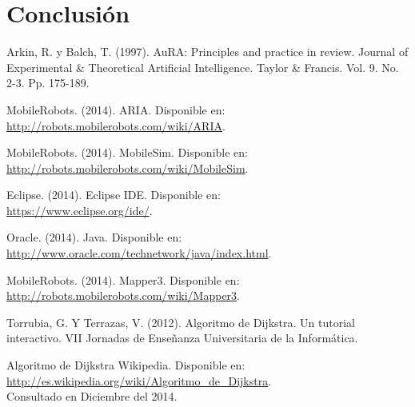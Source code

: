 \documentclass[11pt,twoside,A5]{article}
\newcommand{\link}[1]{{\footnotesize\url{#1}}}
\begin{document}
\section*{Conclusión}

\begin{thebibliography}{999}

	Arkin, R. y Balch, T. (1997).
 	AuRA: Principles and practice in review.
	Journal of Experimental \& Theoretical Artificial Intelligence.
	Taylor \& Francis. Vol. 9. No. 2-3. Pp. 175-189.
	
	MobileRobots. (2014).
	ARIA. 	
	Disponible en: \\\link{http://robots.mobilerobots.com/wiki/ARIA}.
	
	MobileRobots. (2014).
	MobileSim. 	
	Disponible en: \\\link{http://robots.mobilerobots.com/wiki/MobileSim}.
	
	Eclipse. (2014).
	Eclipse IDE. 	
	Disponible en: \\\link{https://www.eclipse.org/ide/}.

	Oracle. (2014).
	Java. 	
	Disponible en: \\\link{http://www.oracle.com/technetwork/java/index.html}.
	
	MobileRobots. (2014).
	Mapper3. 	
	Disponible en: \\\link{http://robots.mobilerobots.com/wiki/Mapper3}.
	
	Torrubia, G. Y Terrazas, V. (2012). 
	Algoritmo de Dijkstra. Un tutorial interactivo. 
	VII Jornadas de Enseñanza Universitaria de la Informática.
	
	Algoritmo de Dijkstra
	Wikipedia.
	Disponible en: \\\link{http://es.wikipedia.org/wiki/Algoritmo_de_Dijkstra}.\\
	Consultado en Diciembre del 2014.
	
\end{thebibliography}
\end{document}

